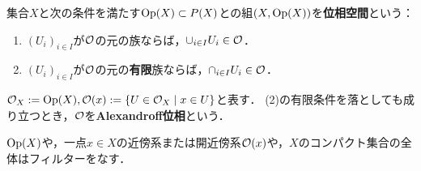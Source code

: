 \documentclass[uplatex,dvipdfmx]{jsreport}
\begin{document}
\begin{definition}
    集合$X$と次の条件を満たす$\mathrm{Op}(X)\subset P(X)$との組$(X,\mathrm{Op}(X))$を\textbf{位相空間}という：
    \begin{enumerate}
        \item $(U_i)_{i\in I}$が$\mathcal{O}$の元の族ならば，$\cup_{i\in I}U_i\in\mathcal{O}$．
        \item $(U_i)_{i\in I}$が$\mathcal{O}$の元の\textbf{有限}族ならば，$\cap_{i\in I}U_i\in\mathcal{O}$．
    \end{enumerate}
    $\mathcal{O}_X:=\mathrm{Op}(X),\mathcal{O}(x):=\left\{U\in\mathcal{O}_X\mid x\in U\right\}$と表す．
    (2)の有限条件を落としても成り立つとき，$\mathcal{O}$を\textbf{Alexandroff位相}という．
\end{definition}

\begin{example}
    $\mathrm{Op}(X)$や，一点$x\in X$の近傍系または開近傍系$\mathcal{O}(x)$や，$X$のコンパクト集合の全体はフィルターをなす．
\end{example}
\end{document}
